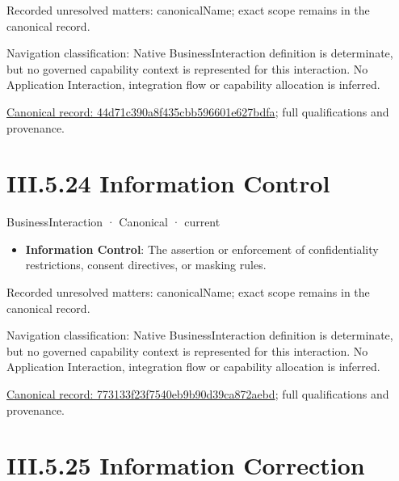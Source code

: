 {\small Recorded unresolved matters: canonicalName; exact scope remains in the canonical record.}\par
{\small Navigation classification: Native BusinessInteraction definition is determinate, but no governed capability context is represented for this interaction. No Application Interaction, integration flow or capability allocation is inferred.}\par
{\footnotesize \href{../../../../../../../../continuum/business/business-interaction/44d71c390a8f435cbb596601e627bdfa.md}{Canonical record: 44d71c390a8f435cbb596601e627bdfa}; full qualifications and provenance.}\par
\section*{III.5.24 Information Control}
\label{navigation:III.5.24}

\label{element:773133f23f7540eb9b90d39ca872aebd}
{\small BusinessInteraction · Canonical · current}\par

\begin{itemize}


\item \textbf{Information Control}: The assertion or enforcement of confidentiality restrictions, consent directives, or masking rules.

\end{itemize}

{\small Recorded unresolved matters: canonicalName; exact scope remains in the canonical record.}\par
{\small Navigation classification: Native BusinessInteraction definition is determinate, but no governed capability context is represented for this interaction. No Application Interaction, integration flow or capability allocation is inferred.}\par
{\footnotesize \href{../../../../../../../../continuum/business/business-interaction/773133f23f7540eb9b90d39ca872aebd.md}{Canonical record: 773133f23f7540eb9b90d39ca872aebd}; full qualifications and provenance.}\par
\section*{III.5.25 Information Correction}
\label{navigation:III.5.25}


